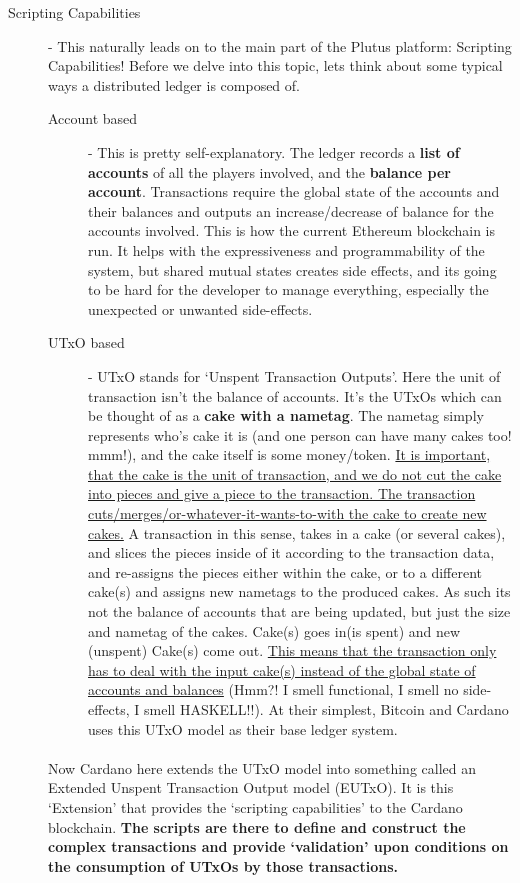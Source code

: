 \documentclass[a4paper, 11pt]{article}
\begin{document}
\begin{description}
        \item[Scripting Capabilities] - This naturally leads on to the main part of the Plutus platform: Scripting Capabilities! Before we delve into this topic, lets think about some typical ways a distributed ledger is composed of.
        
        \begin{description}
            \item[Account based] - This is pretty self-explanatory. The ledger records a \textbf{list of accounts} of all the players involved, and the \textbf{balance per account}. Transactions require the global state of the accounts and their balances and outputs an increase/decrease of balance for the accounts involved. This is how the current Ethereum blockchain is run. It helps with the expressiveness and programmability of the system, but shared mutual states creates side effects, and its going to be hard for the developer to manage everything, especially the unexpected or unwanted side-effects.
            \item[UTxO based] - UTxO stands for `Unspent Transaction Outputs'. Here the unit of transaction isn't the balance of accounts. It's the UTxOs which can be thought of as a \textbf{cake with a nametag}. The nametag simply represents who's cake it is (and one person can have many cakes too! mmm!), and the cake itself is some money/token. \ul{It is important, that the cake is the unit of transaction, and we do not cut the cake into pieces and give a piece to the transaction. The transaction cuts/merges/or-whatever-it-wants-to-with the cake to create new cakes.} A transaction in this sense, takes in a cake (or several cakes), and slices the pieces inside of it according to the transaction data, and re-assigns the pieces either within the cake, or to a different cake(s) and assigns new nametags to the produced cakes. As such its not the balance of accounts that are being updated, but just the size and nametag of the cakes. Cake(s) goes in(is spent) and new (unspent) Cake(s) come out. \ul{This means that the transaction only has to deal with the input cake(s) instead of the global state of accounts and balances} (Hmm?! I smell functional, I smell no side-effects, I smell HASKELL!!). At their simplest, Bitcoin and Cardano uses this UTxO model as their base ledger system.
        \end{description}
        
        \paragraph{} Now Cardano here extends the UTxO model into something called an Extended Unspent Transaction Output model (EUTxO). It is this `Extension' that provides the `scripting capabilities' to the Cardano blockchain. \textbf{The scripts are there to define and construct the complex transactions and provide `validation' upon conditions on the consumption of UTxOs by those transactions.} 
        

\end{description}
\end{document}
